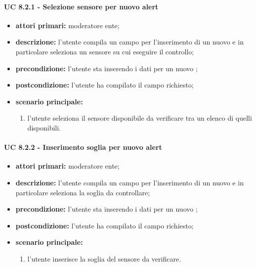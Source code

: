 				\paragraph{UC 8.2.1 - Selezione sensore per nuovo alert}
				\begin{itemize}
					\item \textbf{attori primari:} moderatore ente;
					\item \textbf{descrizione:} l'utente compila un campo per l'inserimento di un nuovo  e in particolare seleziona un sensore su cui eseguire il controllo;
					\item \textbf{precondizione:} l'utente sta inserendo i dati per un nuovo ;
					\item \textbf{postcondizione:} l'utente ha compilato il campo richiesto;
					\item \textbf{scenario principale:}
					\begin{enumerate}
						\item{l'utente seleziona il sensore disponibile da verificare tra un elenco di quelli disponibili.}
					\end{enumerate}
				\end{itemize}

				\paragraph{UC 8.2.2 - Inserimento soglia per nuovo alert}
				\begin{itemize}
					\item \textbf{attori primari:} moderatore ente;
					\item \textbf{descrizione:} l'utente compila un campo per l'inserimento di un nuovo  e in particolare seleziona la soglia da controllare;
					\item \textbf{precondizione:} l'utente sta inserendo i dati per un nuovo ;
					\item \textbf{postcondizione:} l'utente ha compilato il campo richiesto;
					\item \textbf{scenario principale:}
					\begin{enumerate}
						\item{l'utente inserisce la soglia del sensore da verificare.}
					\end{enumerate}
				\end{itemize}

